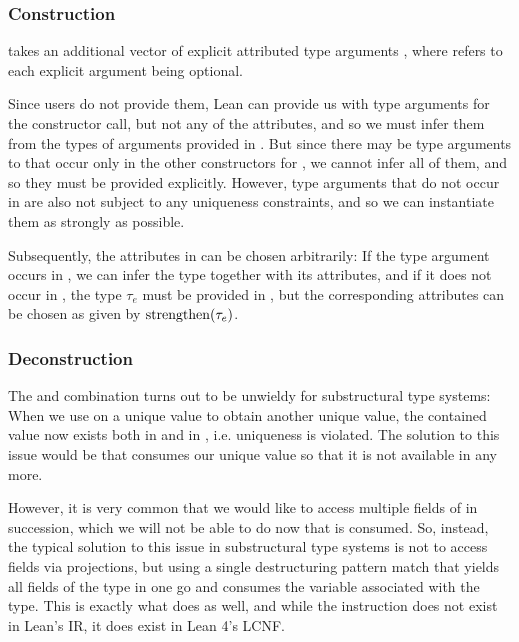 \subsubsection{Construction}
 takes an additional vector of explicit attributed type arguments \icode{[τ?]}, where  refers to each explicit argument being optional. 

Since users do not provide them, Lean can provide us with type arguments \icode{[κ]} for the constructor call, but not any of the attributes, and so we must infer them from the types of arguments provided in \icode{[y]}. But since there may be type arguments to  that occur only in the other constructors for , we cannot infer all of them, and so they must be provided explicitly. However, type arguments that do not occur in \icode{[y]} are also not subject to any uniqueness constraints, and so we can instantiate them as strongly as possible. 

Subsequently, the attributes in \icode{[τ?]} can be chosen arbitrarily: If the type argument occurs in \icode{[y]}, we can infer the type together with its attributes, and if it does not occur in \icode{[y]}, the type $\tau_e$ must be provided in \icode{[τ?]}, but the corresponding attributes can be chosen as given by $\mathrm{strengthen}(\tau_e)$.

\subsubsection{Deconstruction}
The  and  combination turns out to be unwieldy for substructural type systems: When we use  on a unique value to obtain another unique value, the contained value now exists both in  and in , i.e. uniqueness is violated. The solution to this issue would be that  consumes our unique value  so that it is not available in  any more. 

However, it is very common that we would like to access multiple fields of  in succession, which we will not be able to do now that  is consumed. So, instead, the typical solution to this issue in substructural type systems is not to access fields via projections, but using a single destructuring pattern match that yields all fields of the type in one go and consumes the variable associated with the type. This is exactly what  does as well, and while the instruction does not exist in Lean's IR, it does exist in Lean 4's LCNF. 

